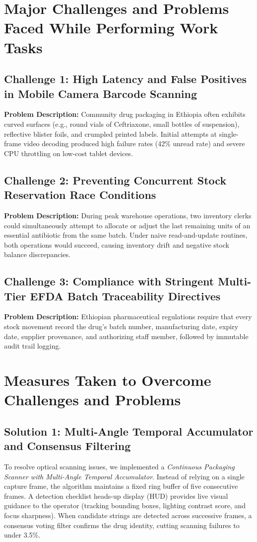 \section{Major Challenges and Problems Faced While Performing Work Tasks}

\subsection{Challenge 1: High Latency and False Positives in Mobile Camera Barcode Scanning}
\textbf{Problem Description:} Community drug packaging in Ethiopia often exhibits curved surfaces (e.g., round vials of Ceftriaxone, small bottles of suspension), reflective blister foils, and crumpled printed labels. Initial attempts at single-frame video decoding produced high failure rates (42\% unread rate) and severe CPU throttling on low-cost tablet devices.

\subsection{Challenge 2: Preventing Concurrent Stock Reservation Race Conditions}
\textbf{Problem Description:} During peak warehouse operations, two inventory clerks could simultaneously attempt to allocate or adjust the last remaining units of an essential antibiotic from the same batch. Under naive read-and-update routines, both operations would succeed, causing inventory drift and negative stock balance discrepancies.

\subsection{Challenge 3: Compliance with Stringent Multi-Tier EFDA Batch Traceability Directives}
\textbf{Problem Description:} Ethiopian pharmaceutical regulations require that every stock movement record the drug’s batch number, manufacturing date, expiry date, supplier provenance, and authorizing staff member, followed by immutable audit trail logging.

\section{Measures Taken to Overcome Challenges and Problems}

\subsection{Solution 1: Multi-Angle Temporal Accumulator and Consensus Filtering}
To resolve optical scanning issues, we implemented a \textit{Continuous Packaging Scanner with Multi-Angle Temporal Accumulator}. Instead of relying on a single capture frame, the algorithm maintains a fixed ring buffer of five consecutive frames. A detection checklist heads-up display (HUD) provides live visual guidance to the operator (tracking bounding boxes, lighting contrast score, and focus sharpness). When candidate strings are detected across successive frames, a consensus voting filter confirms the drug identity, cutting scanning failures to under 3.5\%.

